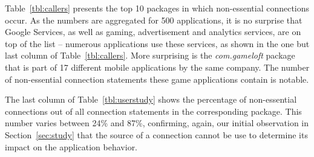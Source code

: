 Table~\ref{tbl:callers} presents the top 10 packages in which
non-essential connections occur.  As the numbers are aggregated for
500 applications, it is no surprise that Google Services, as well
as gaming, advertisement and analytics services, are on top of the
list -- numerous applications use these services, as shown in the one but last
column of Table~\ref{tbl:callers}.
More surprising is the \emph{com.gameloft} package that is part of 17 different mobile applications by the same company. The number of non-essential connection statements these game applications contain is notable. 

The last column of Table~\ref{tbl:userstudy} shows the percentage of non-essential connections out of all connection statements in the corresponding package. This number varies between 24\% and 87\%, confirming, again, our initial observation in Section~\ref{sec:study} that the source of a connection cannot be use to determine its impact on the application behavior. 


 






